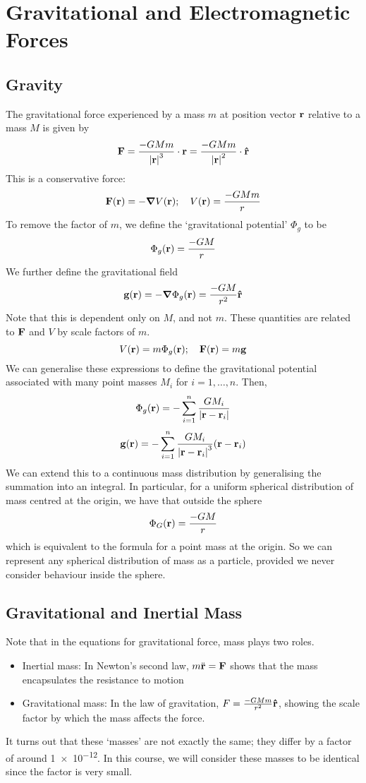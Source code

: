 \documentclass{article}
\begin{document}
\section{Gravitational and Electromagnetic Forces}
\subsection{Gravity}
The gravitational force experienced by a mass $m$ at position vector $\vb r$ relative to a mass $M$ is given by
\[ \vb F = \frac{- G M m}{\abs{\vb r}^3} \cdot \vb r = \frac{- G M m}{\abs{\vb r}^2} \cdot \vu{r} \]
This is a conservative force:
\[ \vb F(\vb r) = -\grad V(\vb r);\quad V(\vb r) = \frac{-GMm}{r} \]
To remove the factor of $m$, we define the `gravitational potential' $\Phi_g$ to be
\[ \Phi_g(\vb r) = \frac{-GM}{r} \]
We further define the gravitational field
\[ \vb g(\vb r) = -\grad \Phi_g(\vb r) = \frac{-GM}{r^2}\vu{r} \]
Note that this is dependent only on $M$, and not $m$. These quantities are related to $\vb F$ and $V$ by scale factors of $m$.
\[ V(\vb r) = m \Phi_g(\vb r);\quad \vb F(\vb r) = m\vb g \]
We can generalise these expressions to define the gravitational potential associated with many point masses $M_i$ for $i = 1, \dots, n$. Then,
\[ \Phi_g(\vb r) = -\sum_{i=1}^n \frac{GM_i}{\abs{\vb r - \vb r_i}} \]
\[ \vb g(\vb r) = -\sum_{i=1}^n \frac{GM_i}{\abs{\vb r - \vb r_i}^3}(\vb r - \vb r_i) \]
We can extend this to a continuous mass distribution by generalising the summation into an integral. In particular, for a uniform spherical distribution of mass centred at the origin, we have that outside the sphere
\[ \Phi_G(\vb r) = \frac{-GM}{r} \]
which is equivalent to the formula for a point mass at the origin. So we can represent any spherical distribution of mass as a particle, provided we never consider behaviour inside the sphere.

\subsection{Gravitational and Inertial Mass}
Note that in the equations for gravitational force, mass plays two roles.
\begin{itemize}
    \item Inertial mass: In Newton's second law, $m \ddot{\vb r} = \vb F$ shows that the mass encapsulates the resistance to motion
    \item Gravitational mass: In the law of gravitation, $F = \frac{-GMm}{r^2}\vu{r}$, showing the scale factor by which the mass affects the force.
\end{itemize}
It turns out that these `masses' are not exactly the same; they differ by a factor of around \num{1e-12}. In this course, we will consider these masses to be identical since the factor is very small.
\end{document}
